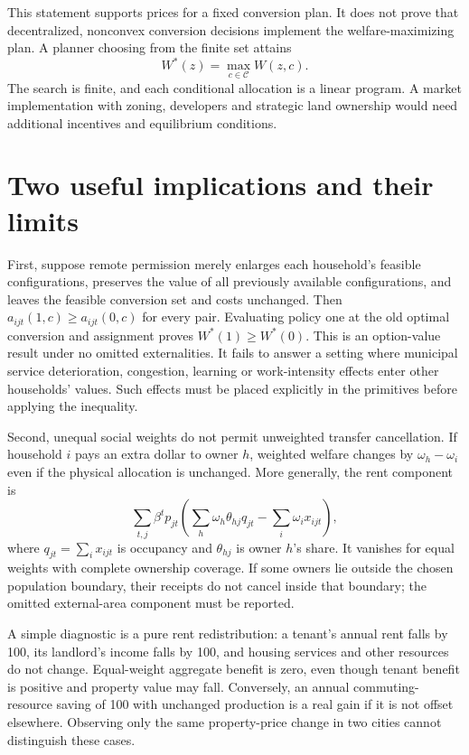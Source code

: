 \documentclass[11pt]{article}
\begin{document}
This statement supports prices for a fixed conversion plan. It does not prove that decentralized, nonconvex conversion decisions implement the welfare-maximizing plan. A planner choosing from the finite set attains
\[
 W^*(z)=\max_{c\in\mathcal C} W(z,c).
\]
The search is finite, and each conditional allocation is a linear program. A market implementation with zoning, developers and strategic land ownership would need additional incentives and equilibrium conditions.

\section*{Two useful implications and their limits}
First, suppose remote permission merely enlarges each household's feasible configurations, preserves the value of all previously available configurations, and leaves the feasible conversion set and costs unchanged. Then $a_{ijt}(1,c)\geq a_{ijt}(0,c)$ for every pair. Evaluating policy one at the old optimal conversion and assignment proves $W^*(1)\geq W^*(0)$. This is an option-value result under no omitted externalities. It fails to answer a setting where municipal service deterioration, congestion, learning or work-intensity effects enter other households' values. Such effects must be placed explicitly in the primitives before applying the inequality.

Second, unequal social weights do not permit unweighted transfer cancellation. If household $i$ pays an extra dollar to owner $h$, weighted welfare changes by $\omega_h-\omega_i$ even if the physical allocation is unchanged. More generally, the rent component is
\[
 \sum_{t,j}\beta^t p_{jt}
 \left(\sum_h\omega_h\theta_{hj}q_{jt}
       -\sum_i\omega_ix_{ijt}\right),
\]
where $q_{jt}=\sum_ix_{ijt}$ is occupancy and $\theta_{hj}$ is owner $h$'s share. It vanishes for equal weights with complete ownership coverage. If some owners lie outside the chosen population boundary, their receipts do not cancel inside that boundary; the omitted external-area component must be reported.

A simple diagnostic is a pure rent redistribution: a tenant's annual rent falls by 100, its landlord's income falls by 100, and housing services and other resources do not change. Equal-weight aggregate benefit is zero, even though tenant benefit is positive and property value may fall. Conversely, an annual commuting-resource saving of 100 with unchanged production is a real gain if it is not offset elsewhere. Observing only the same property-price change in two cities cannot distinguish these cases.
\end{document}
